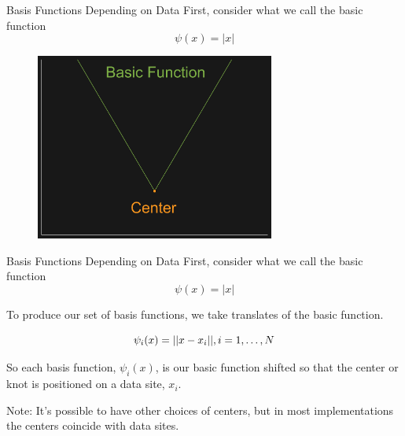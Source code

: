 \documentclass[12pt,t]{beamer}
\newcommand{\subt}[1]{{\footnotesize \color{subtitle} {#1}}}
\begin{document}
\begin{frame}{Basis Functions Depending on Data}
First, consider what we call the \subt{basic function}\\
\begin{equation*}
\psi(x)=|x|
\end{equation*}

\begin{figure}
\includegraphics[width=0.7\textwidth, keepaspectratio]{fig4.png}
\end{figure}

\end{frame}

\begin{frame}{Basis Functions Depending on Data}
First, consider what we call the \subt{basic function}\\
\begin{equation*}
\psi(x)=|x|
\end{equation*}

To produce our set of basis functions, we take translates of the basic function.

\begin{equation*}
\psi_i(x)=||x-x_i||, i=1, \mathellipsis, N
\end{equation*}

So each basis function, $\psi_i(x)$, is our basic function shifted so that the \subt{center} or \subt{knot} is positioned on a data site, $x_i$.
\bigskip

\subt{Note:} It's possible to have other choices of centers, but in most implementations the centers coincide with data sites.

\end{frame}
\end{document}
